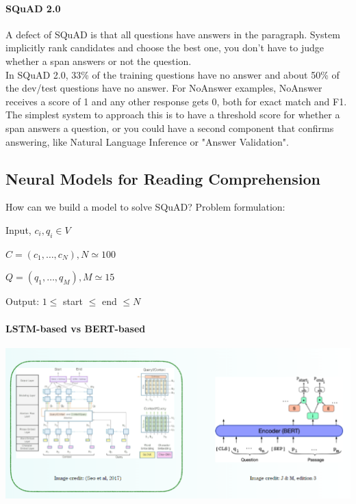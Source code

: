 \documentclass[10pt]{report}
\begin{document}
\paragraph{SQuAD 2.0} A defect of SQuAD is that all questions have answers in the paragraph. System implicitly rank candidates and choose the best one, you don't have to judge whether a span answers or not the question.\\
In SQuAD 2.0, 33\% of the training questions have no answer and about 50\% of the dev/test questions have no answer. For NoAnswer examples, NoAnswer receives a score of 1 and any other response gets 0, both for exact match and F1.\\
The simplest system to approach this is to have a threshold score for whether a span answers a question, or you could have a second component that confirms answering, like Natural Language Inference or "Answer Validation".
\subsection{Neural Models for Reading Comprehension}
How can we build a model to solve SQuAD? Problem formulation:
\begin{list}{}{}
	\item Input, $c_i,q_i\in V$
	\begin{list}{}{}
		\item $C=(c_1,\ldots,c_N), N\simeq 100$
		\item $Q=(q_1,\ldots,q_M), M\simeq 15$
	\end{list}
	\item Output: $1\leq$ start $\leq$ end $\leq N$
\end{list}
\pagebreak
\paragraph{LSTM-based vs BERT-based}
\begin{center}
	\includegraphics[scale=0.33]{123.png}
\end{center}
\end{document}

